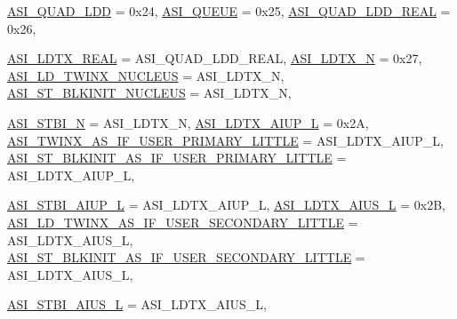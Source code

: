 \begin{DoxyCompactItemize}
\hyperlink{namespaceSparcISA_a6dd43f1311515252b283f56d7095a1f3a4577a5a5b497a9f9441b113d50d6479c}{ASI\_\-QUAD\_\-LDD} =  0x24, 
\hyperlink{namespaceSparcISA_a6dd43f1311515252b283f56d7095a1f3ad4d4afc40a6d7eb77ef1a442ab9017a6}{ASI\_\-QUEUE} =  0x25, 
\hyperlink{namespaceSparcISA_a6dd43f1311515252b283f56d7095a1f3a2a804cb45bff869d0d831d4dbe2119b2}{ASI\_\-QUAD\_\-LDD\_\-REAL} =  0x26, 
\par
\hyperlink{namespaceSparcISA_a6dd43f1311515252b283f56d7095a1f3aaa18842cbf21dca186307a81af01f77b}{ASI\_\-LDTX\_\-REAL} =  ASI\_\-QUAD\_\-LDD\_\-REAL, 
\hyperlink{namespaceSparcISA_a6dd43f1311515252b283f56d7095a1f3a2de75f7569dd8a51ffb1bf916207fd37}{ASI\_\-LDTX\_\-N} =  0x27, 
\hyperlink{namespaceSparcISA_a6dd43f1311515252b283f56d7095a1f3a61389f49147eb7a8de95e92c2e891ddb}{ASI\_\-LD\_\-TWINX\_\-NUCLEUS} =  ASI\_\-LDTX\_\-N, 
\hyperlink{namespaceSparcISA_a6dd43f1311515252b283f56d7095a1f3aab36bd26da491a935e00561c721d8908}{ASI\_\-ST\_\-BLKINIT\_\-NUCLEUS} =  ASI\_\-LDTX\_\-N, 
\par
\hyperlink{namespaceSparcISA_a6dd43f1311515252b283f56d7095a1f3af8e8430c9af101e12e9ccd93adde2dc8}{ASI\_\-STBI\_\-N} =  ASI\_\-LDTX\_\-N, 
\hyperlink{namespaceSparcISA_a6dd43f1311515252b283f56d7095a1f3a2a5847886199a722e6e2a7907b047879}{ASI\_\-LDTX\_\-AIUP\_\-L} =  0x2A, 
\hyperlink{namespaceSparcISA_a6dd43f1311515252b283f56d7095a1f3a1c806ee02becd69093b5774e775487ec}{ASI\_\-TWINX\_\-AS\_\-IF\_\-USER\_\-PRIMARY\_\-LITTLE} =  ASI\_\-LDTX\_\-AIUP\_\-L, 
\hyperlink{namespaceSparcISA_a6dd43f1311515252b283f56d7095a1f3a1e8bba3c90156bf800b4466ce10b864c}{ASI\_\-ST\_\-BLKINIT\_\-AS\_\-IF\_\-USER\_\-PRIMARY\_\-LITTLE} =  ASI\_\-LDTX\_\-AIUP\_\-L, 
\par
\hyperlink{namespaceSparcISA_a6dd43f1311515252b283f56d7095a1f3ad00fa339c2dfc6bdcf87bab8c4fd3201}{ASI\_\-STBI\_\-AIUP\_\-L} =  ASI\_\-LDTX\_\-AIUP\_\-L, 
\hyperlink{namespaceSparcISA_a6dd43f1311515252b283f56d7095a1f3ac43d9f8a3a1a1fef502ec2d294deb829}{ASI\_\-LDTX\_\-AIUS\_\-L} =  0x2B, 
\hyperlink{namespaceSparcISA_a6dd43f1311515252b283f56d7095a1f3aebbbf4ac075cfb3a9a4c1ef18522dc1c}{ASI\_\-LD\_\-TWINX\_\-AS\_\-IF\_\-USER\_\-SECONDARY\_\-LITTLE} =  ASI\_\-LDTX\_\-AIUS\_\-L, 
\hyperlink{namespaceSparcISA_a6dd43f1311515252b283f56d7095a1f3a08b0e949c44a997ea7a8de5ab0afad18}{ASI\_\-ST\_\-BLKINIT\_\-AS\_\-IF\_\-USER\_\-SECONDARY\_\-LITTLE} =  ASI\_\-LDTX\_\-AIUS\_\-L, 
\par
\hyperlink{namespaceSparcISA_a6dd43f1311515252b283f56d7095a1f3a9581f3bb14faa6f5e6502b2952605daa}{ASI\_\-STBI\_\-AIUS\_\-L} =  ASI\_\-LDTX\_\-AIUS\_\-L, 

\end{DoxyCompactItemize}
